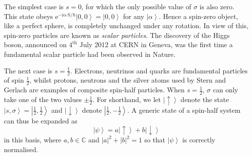 \documentclass{article}
\theoremstyle{plain}\theoremheaderfont{\normalfont\itshape}\theorembodyfont{\rmfamily}\theoremseparator{.}\newtheorem*{rem}{Remark}\newtheorem*{ex}{Example}\newtheorem*{proof}{Proof}\newtheorem*{altp}{Alternative proof}
\theoremstyle{plain}\theoremheaderfont{\normalfont\bfseries}\theorembodyfont{\rmfamily}\theoremseparator{.}\newtheorem{thm}{Theorem}[section]\newtheorem{lem}[thm]{Lemma}\newtheorem{prop}[thm]{Proposition}\newtheorem*{cor}{Corollary}\newtheorem{defn}[thm]{Definition}\newtheorem{clm}[thm]{Claim}\newtheorem{clminproof}{Claim}
\theoremstyle{break}\theoremheaderfont{\normalfont\itshape}\theorembodyfont{\rmfamily}\theoremseparator{.\medskip}\newtheorem*{proofskip}{Proof}\newtheorem*{exs}{Examples}\newtheorem*{rems}{Remarks}
\theoremstyle{break}\theoremheaderfont{\normalfont\bfseries}\theorembodyfont{\rmfamily}\theoremseparator{.\medskip}\newtheorem{lemskip}[thm]{Lemma}\newtheorem{defnskip}[thm]{Definition}\newtheorem{propskip}[thm]{Proposition}\newtheorem{thmskip}[thm]{Theorem}
\numberwithin{equation}{section}
\newcommand{\ii}{\mathrm{i}}
\newcommand{\ee}{\mathrm{e}}
\newcommand{\ket}[1]{\left| #1 \right\rangle}
\newcommand{\vb}[1]{\bm{\mathrm{#1}}}
\newcommand{\vdot}{\bm{\cdot}}
\newcommand{\abs}[1]{\left| #1 \right|}
\newcommand{\CC}{\mathbb{C}}
\begin{document}
    The simplest case is \(s=0\), for which the only possible value of \(\sigma\) is also zero. This state obeys \(\ee^{-\ii \vb{\alpha}\vdot\vb{S}/\hbar}\ket{0,0}=\ket{0,0}\) for any \(\ket{\alpha}\). Hence a spin-zero object, like a perfect sphere, is completely unchanged under any rotation. In view of this, spin-zero particles are known as \textit{scalar particles}. The discovery of the Higgs boson, announced on \(4^{\text{th}}\) July 2012 at CERN in Geneva, was the first time a fundamental scalar particle had been observed in Nature.

    The next case is \(s=\frac{1}{2}\). Electrons, neutrinos and quarks are fundamental particles of spin \(\frac{1}{2}\), whilst protons, neutrons and the silver atoms used by Stern and Gerlach are examples of composite spin-half particles. When \(s=\frac{1}{2}\), \(\sigma\) can only take one of the two values \(\pm\frac{1}{2}\). For shorthand, we let \(\ket{\uparrow}\) denote the state \(\ket{s,\sigma}=\ket{\frac{1}{2},\frac{1}{2}}\) and \(\ket{\downarrow}\) denote \(\ket{\frac{1}{2},-\frac{1}{2}}\). A generic state of a spin-half system can thus be expanded as
    \begin{equation}
        \ket{\psi}=a\ket{\uparrow}+b\ket{\downarrow}
    \end{equation}
    in this basis, where \(a,b\in\CC\) and \(\abs{a}^2+\abs{b}^2=1\) so that \(\ket{\psi}\) is correctly normalised.
\end{document}
